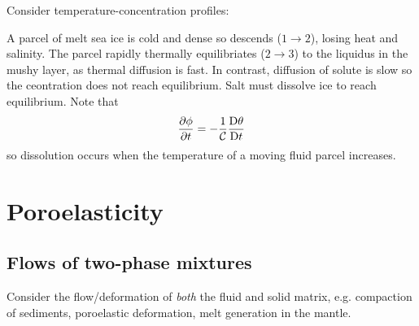 \documentclass{jknotes}
\newcommand{\C}{\mathcal{C}}
\begin{document}
Consider temperature-concentration profiles:
\begin{center}
\end{center}

A parcel of melt sea ice is cold and dense so descends ($1 \to 2$), losing heat and
salinity. The parcel rapidly thermally equilibriates ($2 \to 3$) to the liquidus in the
mushy layer, as thermal diffusion is fast. In contrast, diffusion of solute is
slow so the ceontration does not reach equilibrium. Salt must dissolve ice
to reach equilibrium. Note that
\begin{equation}
	\frac{\partial \phi}{\partial t} = -\frac{1}{\C} \frac{\diffD
	\theta}{\diffD t}
\end{equation}
so dissolution occurs when the temperature of a moving fluid parcel
increases.

\section{Poroelasticity}
\subsection{Flows of two-phase mixtures}
Consider the flow/deformation of \emph{both} the fluid and solid matrix, e.g.
compaction of sediments, poroelastic deformation, melt generation in the
mantle. 
\end{document}
